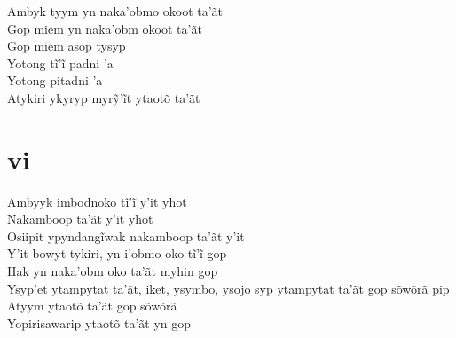 \begin{linenumbers}\begingroup\raggedright
 
\noindent   Ambyk tyym yn naka'obmo okoot ta'ãt\\
  Gop miem yn naka'obm okoot ta'ãt\\
  Gop miem asop tysyp\\
  Yotong tĩ’ĩ padni ’a\\
  Yotong pitadni 'a\\
  Atykiri ykyryp myrỹ’ĩt ytaotõ ta’ãt
 
 
 \medskip
\section{vi}

  \noindent Ambyyk imbodnoko tĩ’ĩ y’it yhot\\
  Nakamboop ta'ãt y'it yhot\\
  Osiipit ypyndangĩwak nakamboop ta’ãt y’it\\
  Y’it bowyt tykiri, yn i’obmo oko tĩ’ĩ gop\\
  Hak yn naka'obm oko ta'ãt myhin gop\\
  Ysyp'et ytampytat ta'ãt, iket, ysymbo, ysojo syp ytampytat ta'ãt gop sõwõrã pip\\
  Atyym ytaotõ ta'ãt gop sõwõrã\\
  Yopirisawarip ytaotõ ta'ãt yn gop
 
\end{linenumbers}\endgroup

